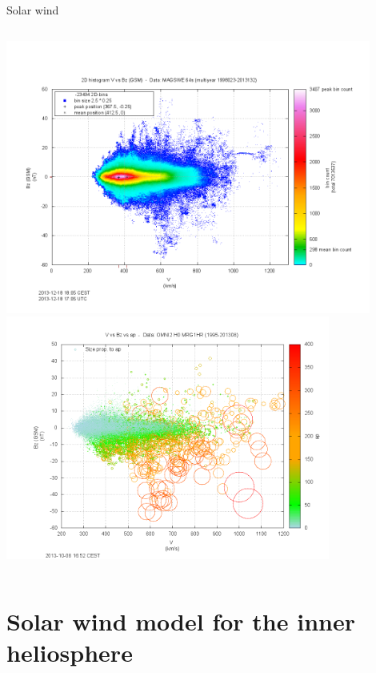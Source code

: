 \begin{frame}[plain,c]{Solar wind}{}
\begin{columns}[c]
		\includegraphics[width=0.9\textwidth]{../talk_figures/2Dhistogram_VBzgsm_2-5x025_plot.png}\\
		\includegraphics[width=0.8\textwidth]{../talk_figures/V_vs_Bz_vs_ap_plot.png}
		
	\end{columns}
\end{frame}


\section{Solar wind model for the inner heliosphere}

